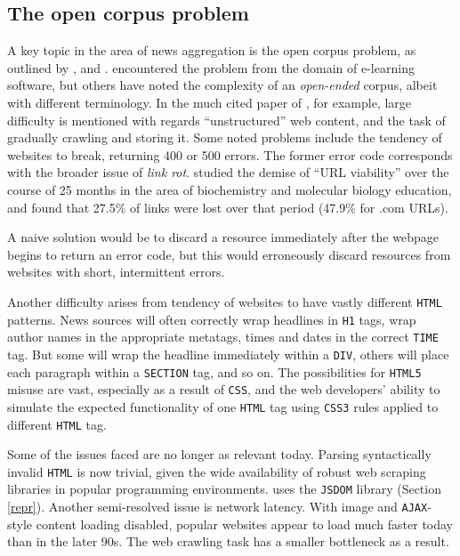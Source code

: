 \subsection{The open corpus problem}

A key topic in the area of news aggregation is the open
corpus problem, as outlined by \cite{henze2001},
 and  . 
encountered the problem from the domain of e-learning
software, but others have noted the complexity of an
{\it open-ended} corpus, albeit with different terminology.
In the much cited paper of , for example,
large difficulty is mentioned with regards ``unstructured''
web content, and the task of gradually crawling and storing
it.  Some noted problems include the tendency of websites to
break, returning 400 or 500 errors.  The former error code
corresponds with the broader issue of {\it link rot}.
 studied the demise of ``URL viability''
over the course of 25 months in the area of
biochemistry and molecular biology education, and found that
27.5\% of links were lost over that period (47.9\% for .com
URLs).

A naive solution would be to discard a resource immediately
after the webpage begins to return an error code, but this
would erroneously discard resources from websites with
short, intermittent errors.

Another difficulty arises from tendency of websites to have
vastly different {\tt HTML} patterns.  News sources will often correctly
wrap headlines in {\tt H1} tags, wrap author names in the
appropriate metatags, times and dates in the correct {\tt TIME} tag.
But some will wrap the headline immediately within a {\tt DIV},
others will place each paragraph within a {\tt SECTION} tag, and
so on. The possibilities for {\tt HTML5} misuse are vast, especially
as a result of {\tt CSS}, and the web developers' ability to
simulate the expected functionality of one {\tt HTML} tag using
{\tt CSS3} rules applied to different {\tt HTML} tag.

Some of the issues \citeauthor{page1998} faced are no longer as
relevant today.  Parsing syntactically invalid {\tt HTML} is
now trivial, given the wide availability of robust web scraping
libraries in popular programming environments.
\nr{} uses the {\tt JSDOM} library (Section \ref{repr}).  Another
semi-resolved issue is network latency. With image and
{\tt AJAX}-style content loading disabled, popular websites
appear to load much faster today than in the later 90s.
The web crawling task has a smaller bottleneck as a result.

